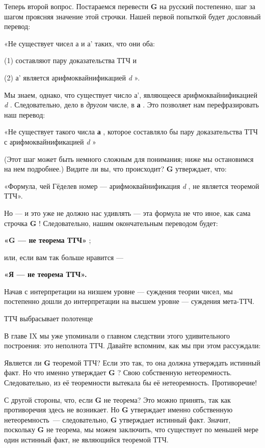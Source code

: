 \documentclass[../main.tex]{subfiles}
\begin{document}
Теперь второй вопрос. Постараемся перевести \textbf{G} на русский постепенно, шаг за шагом проясняя значение этой строчки. Нашей первой попыткой будет дословный перевод:

«Не существует чисел а и а' таких, что они оба:

(1) составляют пару доказательства ТТЧ и

(2) а' является арифмоквайнификацией \emph{d} ».

Мы знаем, однако, что существует число а', являющееся арифмоквайнификацией \emph{d} . Следовательно, дело в \emph{другом} числе, в \textbf{а} . Это позволяет нам перефразировать наш перевод:

«Не существует такого числа \textbf{а} , которое составляло бы пару доказательства ТТЧ с арифмоквайнификацией \emph{d} »

(Этот шаг может быть немного сложным для понимания; ниже мы остановимся на нем подробнее.) Видите ли вы, что происходит? \textbf{G} утверждает, что:

«Формула, чей Гёделев номер --- арифмоквайнификация \emph{d} , не является теоремой ТТЧ».

Но --- и это уже не должно нас удивлять --- эта формула не что иное, как сама строчка \textbf{G} ! Следовательно, нашим окончательным переводом будет:

\textbf{«G --- не теорема ТТЧ»} ;

или, если вам так больше нравится ---

\textbf{«Я --- не теорема ТТЧ».}

Начав с интерпретации на низшем уровне --- суждения теории чисел, мы постепенно дошли до интерпретации на высшем уровне --- суждения мета-ТТЧ.

ТТЧ выбрасывает полотенце

В главе IX мы уже упоминали о главном следствии этого удивительного построения: это неполнота ТТЧ. Давайте вспомним, как мы при этом рассуждали:

Является ли \textbf{G} теоремой ТТЧ? Если это так, то она должна утверждать истинный факт. Но что именно утверждает \textbf{G} ? Свою собственную нетеоремность. Следовательно, из её теоремности вытекала бы её нетеоремность. Противоречие!

С другой стороны, что, если \textbf{G} не теорема? Это можно принять, так как противоречия здесь не возникает. Но \textbf{G} утверждает именно собственную нетеоремность~--- следовательно, \textbf{G} утверждает истинный факт. Значит, поскольку \textbf{G} не теорема, мы можем заключить, что существует по меньшей мере один истинный факт, не являющийся теоремой ТТЧ.
\end{document}
